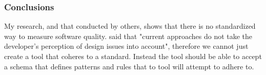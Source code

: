 \subsubsection{Conclusions}
My research, and that conducted by others, shows that there is no standardized way to measure software quality. \cite{10.1145/3428029.3428047, 10.1145/2674683.2674702} said that "current approaches do not take the developer's perception of design issues into account", therefore we cannot just create a tool that coheres to a standard. Instead the tool should be able to accept a schema that defines patterns and rules that to tool will attempt to adhere to.
